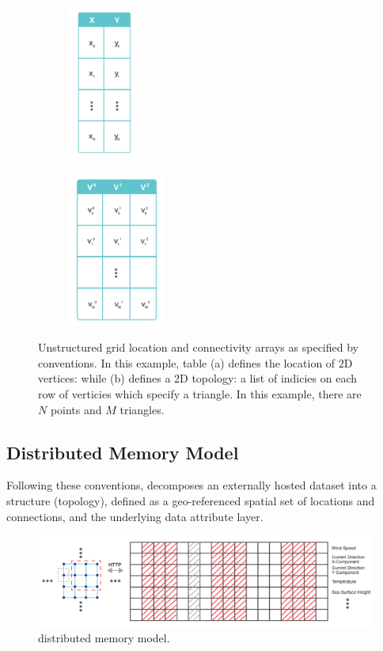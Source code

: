 \begin{figure}
  \centering
  \begin{subfigure}[t]{0.45\textwidth}
    \centering
    \includegraphics[height=2in]{../figs/xy_table}
    \caption{}
    \label{fig:xytable}
  \end{subfigure}
  \begin{subfigure}[t]{0.45\textwidth}
    \centering
    \includegraphics[height=2in]{../figs/v_table}
    \caption{}
    \label{fig:vtable}
  \end{subfigure}
  \caption{Unstructured grid location and connectivity arrays as
    specified by \cfugrid{} conventions. In this example, table (a)
    defines the location of 2D vertices: while (b) defines a 2D
    topology: a list of indicies on each row of verticies which
    specify a triangle. In this example, there are $N$ points and $M$
    triangles.}
\end{figure}

\subsection{Distributed Memory Model}
Following these conventions, \sciwms{} decomposes an externally hosted
dataset into a structure (topology), defined as a geo-referenced
spatial set of locations and connections, and the underlying data
attribute layer.

\begin{figure}[ht!]
  \centering
  \includegraphics[width=\textwidth]{../figs/topology_memModel}
  \caption{\sciwms{} distributed memory model.}
  \label{fig:sciwms_mem_model}
\end{figure}

